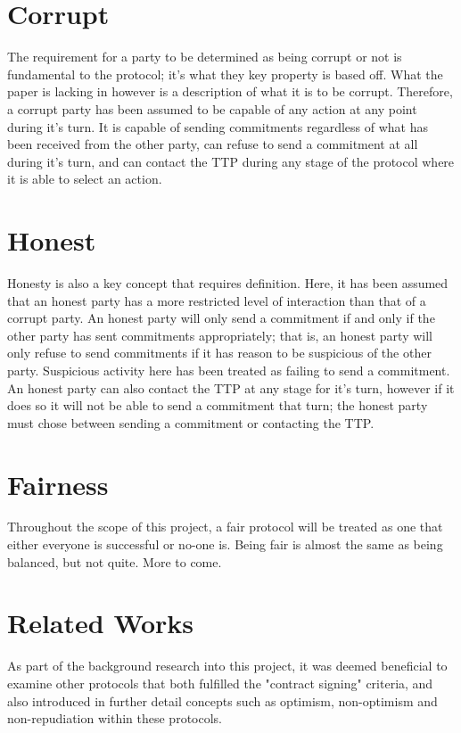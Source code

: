 \documentclass{l4proj}
\begin{document}
\section{Corrupt}

The requirement for a party to be determined as being corrupt or not is fundamental to the protocol; it's what they key property is based off. What the paper is lacking in however is a description of what it is to be corrupt. Therefore, a corrupt party has been assumed to be capable of any action at any point during it's turn. It is capable of sending commitments regardless of what has been received from the other party, can refuse to send a commitment at all during it's turn, and can contact the TTP during any stage of the protocol where it is able to select an action.

\section{Honest}

Honesty is also a key concept that requires definition. Here, it has been assumed that an honest party has a more restricted level of interaction than that of a corrupt party. An honest party will only send a commitment if and only if the other party has sent commitments appropriately; that is, an honest party will only refuse to send commitments if it has reason to be suspicious of the other party. Suspicious activity here has been treated as failing to send a commitment. An honest party can also contact the TTP at any stage for it's turn, however if it does so it will not be able to send a commitment that turn; the honest party must chose between sending a commitment or contacting the TTP.

\section{Fairness}

Throughout the scope of this project, a fair protocol will be treated as one that either everyone is successful or no-one is. Being fair is almost the same as being balanced, but not quite. More to come. 

\section{Related Works}

As part of the background research into this project, it was deemed beneficial to examine other protocols that both fulfilled the "contract signing" criteria, and also introduced in further detail concepts such as optimism, non-optimism and non-repudiation within these protocols.
\end{document}
